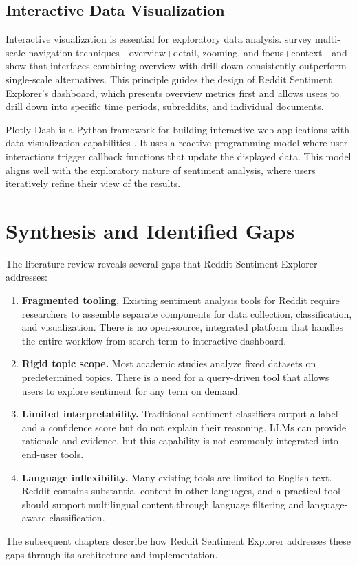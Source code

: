 \subsection{Interactive Data Visualization}

Interactive visualization is essential for exploratory data analysis.  survey multi-scale navigation techniques---overview+detail, zooming, and focus+context---and show that interfaces combining overview with drill-down consistently outperform single-scale alternatives. This principle guides the design of Reddit Sentiment Explorer's dashboard, which presents overview metrics first and allows users to drill down into specific time periods, subreddits, and individual documents.

Plotly Dash is a Python framework for building interactive web applications with data visualization capabilities \cite{plotly2020dash}. It uses a reactive programming model where user interactions trigger callback functions that update the displayed data. This model aligns well with the exploratory nature of sentiment analysis, where users iteratively refine their view of the results.

\section{Synthesis and Identified Gaps}
\label{sec:synthesis}

The literature review reveals several gaps that Reddit Sentiment Explorer addresses:

\begin{enumerate}
    \item \textbf{Fragmented tooling.} Existing sentiment analysis tools for Reddit require researchers to assemble separate components for data collection, classification, and visualization. There is no open-source, integrated platform that handles the entire workflow from search term to interactive dashboard.

    \item \textbf{Rigid topic scope.} Most academic studies analyze fixed datasets on predetermined topics. There is a need for a query-driven tool that allows users to explore sentiment for any term on demand.

    \item \textbf{Limited interpretability.} Traditional sentiment classifiers output a label and a confidence score but do not explain their reasoning. LLMs can provide rationale and evidence, but this capability is not commonly integrated into end-user tools.

    \item \textbf{Language inflexibility.} Many existing tools are limited to English text. Reddit contains substantial content in other languages, and a practical tool should support multilingual content through language filtering and language-aware classification.
\end{enumerate}

The subsequent chapters describe how Reddit Sentiment Explorer addresses these gaps through its architecture and implementation.
